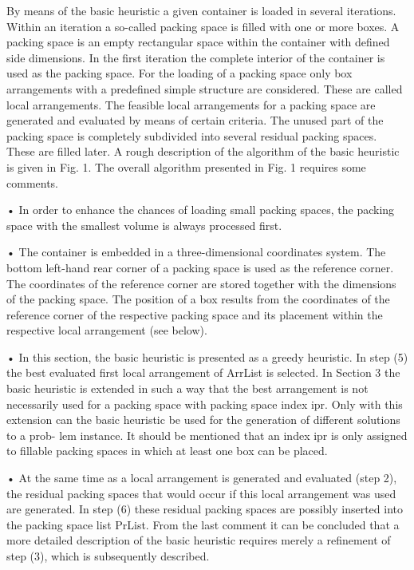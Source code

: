 
By means of the basic heuristic a given container is loaded in several iterations.
Within an iteration a so-called packing space is filled with one or more boxes.
A packing space is an empty rectangular space within the container with defined side
dimensions. In the first iteration the complete interior of the container is used as the
packing space. For the loading of a packing space only box arrangements with a predefined
simple structure are considered. These are called local arrangements. The
feasible local arrangements for a packing space are generated and evaluated by
means of certain criteria. The unused part of the packing space is completely subdivided
into several residual packing spaces. These are filled later. A rough description
of the algorithm of the basic heuristic is given in Fig. 1.
The overall algorithm presented in Fig. 1 requires some comments.

• In order to enhance the chances of loading small packing spaces, the packing
space with the smallest volume is always processed first.

• The container is embedded in a three-dimensional coordinates system. The bottom
left-hand rear corner of a packing space is used as the reference corner.
The coordinates of the reference corner are stored together with the dimensions
of the packing space. The position of a box results from the coordinates of the
reference corner of the respective packing space and its placement within the respective
local arrangement (see below).

• In this section, the basic heuristic is presented as a greedy heuristic. In step (5) the
best evaluated first local arrangement of ArrList is selected. In Section 3 the basic
heuristic is extended in such a way that the best arrangement is not necessarily
used for a packing space with packing space index ipr. Only with this extension
can the basic heuristic be used for the generation of different solutions to a prob-
lem instance. It should be mentioned that an index ipr is only assigned to fillable
packing spaces in which at least one box can be placed.

• At the same time as a local arrangement is generated and evaluated (step 2), the
residual packing spaces that would occur if this local arrangement was used are
generated. In step (6) these residual packing spaces are possibly inserted into
the packing space list PrList.
From the last comment it can be concluded that a more detailed description of the
basic heuristic requires merely a refinement of step (3), which is subsequently described.


